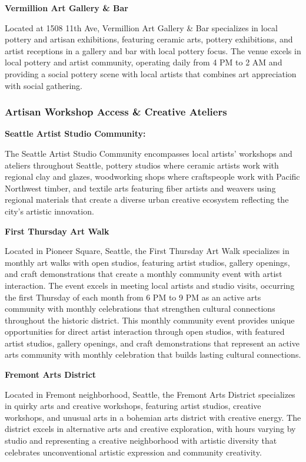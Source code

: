 \documentclass[
  11pt,
  letterpaper,
  DIV=10,
  numbers=noendperiod]{scrartcl}
\begin{document}
\textbf{Vermillion Art Gallery \& Bar}

Located at 1508 11th Ave, Vermillion Art Gallery \& Bar specializes in
local pottery and artisan exhibitions, featuring ceramic arts, pottery
exhibitions, and artist receptions in a gallery and bar with local
pottery focus. The venue excels in local pottery and artist community,
operating daily from 4 PM to 2 AM and providing a social pottery scene
with local artists that combines art appreciation with social gathering.

\subsubsection{Artisan Workshop Access \& Creative
Ateliers}\label{artisan-workshop-access-creative-ateliers-4}

\textbf{Seattle Artist Studio Community:}

The Seattle Artist Studio Community encompasses local artists' workshops
and ateliers throughout Seattle, pottery studios where ceramic artists
work with regional clay and glazes, woodworking shops where craftspeople
work with Pacific Northwest timber, and textile arts featuring fiber
artists and weavers using regional materials that create a diverse urban
creative ecosystem reflecting the city's artistic innovation.

\textbf{First Thursday Art Walk}

Located in Pioneer Square, Seattle, the First Thursday Art Walk
specializes in monthly art walks with open studios, featuring artist
studios, gallery openings, and craft demonstrations that create a
monthly community event with artist interaction. The event excels in
meeting local artists and studio visits, occurring the first Thursday of
each month from 6 PM to 9 PM as an active arts community with monthly
celebrations that strengthen cultural connections throughout the
historic district. This monthly community event provides unique
opportunities for direct artist interaction through open studios, with
featured artist studios, gallery openings, and craft demonstrations that
represent an active arts community with monthly celebration that builds
lasting cultural connections.

\textbf{Fremont Arts District}

Located in Fremont neighborhood, Seattle, the Fremont Arts District
specializes in quirky arts and creative workshops, featuring artist
studios, creative workshops, and unusual arts in a bohemian arts
district with creative energy. The district excels in alternative arts
and creative exploration, with hours varying by studio and representing
a creative neighborhood with artistic diversity that celebrates
unconventional artistic expression and community creativity.
\end{document}
